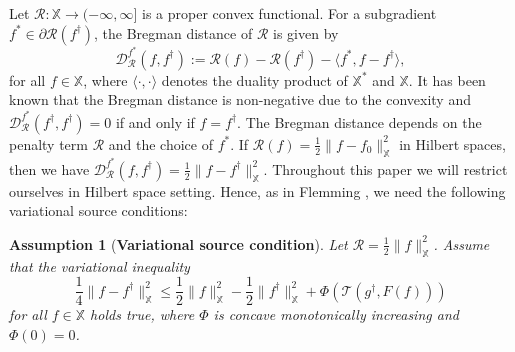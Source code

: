 \documentclass[10pt]{iopart}
\newtheorem{assumption}[theorem]{Assumption}
\begin{document}
Let $\mathcal{R}: \mathbb{X}\rightarrow (-\infty, \infty]$ is a proper convex functional. For a subgradient $f^{*}\in\partial\mathcal{R}
(f^{\dagger})$, the Bregman distance of $\mathcal{R}$ is given by
\begin{equation*}
\mathcal{D}_{\mathcal{R}}^{f^{*}}(f, f^{\dagger}):= \mathcal{R}(f)-\mathcal{R}(f^{\dagger})-\langle f^{*}, 
f-f^{\dagger}\rangle,
\end{equation*}
for all $f\in\mathbb{X}$, where $\langle \cdot, \cdot\rangle$ denotes the duality product of $\mathbb{X}^{*}$ and $\mathbb{X}$. It has been known 
that the Bregman distance is non-negative due to the convexity and $\mathcal{D}_{\mathcal{R}}^{f^{*}}(f^{\dagger}, f^{\dagger})=0$ if and only if
$f=f^{\dagger}$. The Bregman distance depends on the penalty term $\mathcal{R}$ and the choice of $f^{*}$. If $\mathcal{R}(f)=\frac{1}{2}\|f-
f_{0}\|_{\mathbb{X}}^{2}$ in Hilbert spaces, then we have $\mathcal{D}_{\mathcal{R}}^{f^{*}}(f, f^{\dagger})=\frac{1}{2}\|f-f^{\dagger}\|
_{\mathbb{X}}^{2}$. Throughout this paper we will restrict ourselves in Hilbert space setting. Hence, as in Flemming \cite{Flemming2012}, 
we need the following variational source conditions:

\begin{assumption}[{\bf Variational source condition}] \label{assumption-4.1}
Let $\mathcal{R}=\frac{1}{2}\|f\|_{\mathbb{X}}^{2}$. Assume that the variational inequality
\begin{equation}\label{22}
\frac{1}{4} \|f-f^{\dagger}\|_{\mathbb{X}}^{2}\leq \frac{1}{2}\|f\|_{\mathbb{X}}^{2}-\frac{1}{2}\|f^{\dagger}\|_{\mathbb{X}}^{2}+
\Phi\left(\mathcal{T}(g^{\dagger}, F(f))\right)
\end{equation}
for all $f\in\mathbb{X}$ holds true, where $\Phi$ is concave monotonically increasing and $\Phi(0)=0$.
\end{assumption}
\end{document}
